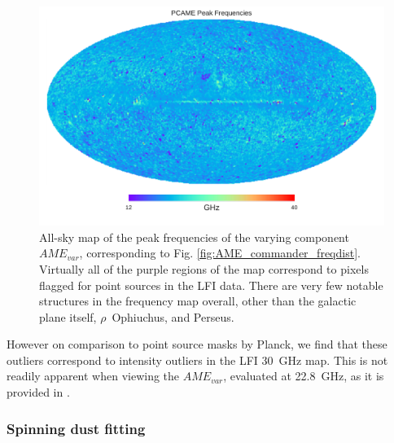            \begin{figure}
             \includegraphics[width=\textwidth]{../Plots/ch_datasources/PCAME_var_freq.pdf}
             \centering
             \caption{All-sky map of the peak frequencies of the varying component $AME_{var}$, corresponding to Fig. \ref{fig:AME_commander_freqdist}. Virtually all of the purple regions of the map correspond to pixels flagged for point sources in the LFI data. There are very few notable structures in the frequency map overall, other than the galactic plane itself, $\rho$~Ophiuchus, and Perseus.}
             \label{fig:PCAME_var_freq}
           \end{figure}
            However on comparison to point source masks by Planck, we find that these outliers correspond to intensity outliers in the LFI 30~GHz map. This is not readily apparent when viewing the $AME_{var}$, evaluated at 22.8~GHz, as it is provided in \cite{planck15X}.

        \subsubsection{Spinning dust fitting}

